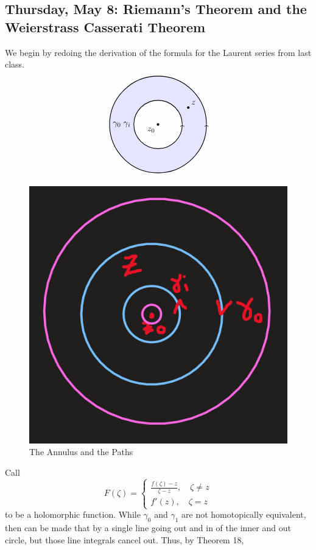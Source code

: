 \documentclass[10pt, oneside]{article}
\theoremstyle{definition}
\begin{document}
\newpage
\subsection{Thursday, May 8: Riemann's Theorem and the Weierstrass Casserati Theorem}
We begin by redoing the derivation of the formula for the Laurent series from last class. 
\[\begin{tikzpicture}[scale=1]
      \coordinate (O) at (0,0);
      \fill[blue!10, even odd rule]
        (O) circle (2cm)
        (O) circle (1cm);

      \draw[thick, ->] 
        (2,0) arc (0:360:2cm) 
        node[midway, right] {$\gamma_0$};

      \draw[thick, ->] 
        (1,0) arc (0:360:1cm)
        node[midway, left] {$\gamma_i$};

      \fill (O) circle (1.5pt) node[below left] {$z_0$};

      \coordinate (Z) at (1.25,0.7);
      \fill (Z) circle (1.5pt) node[above right] {$z$};
    \end{tikzpicture}\]
\begin{figure}[H]
    \centering
    \includegraphics[width=0.5\linewidth]{Images/anus.png}
    \caption{The Annulus and the Paths}
\end{figure}
Call 
\[F(\zeta) = \begin{cases}
    \frac{f(\zeta) - z }{\zeta - z}, \quad \zeta\neq z\\
    f'(z), \quad \zeta = z
\end{cases}\] to be a holomorphic function. While $\gamma_0$ and $\gamma_1$ are not homotopically equivalent, then can be made that by a single line going out and in of the inner and out circle, but those line integrals cancel out. Thus, by Theorem 18, 
\end{document}

